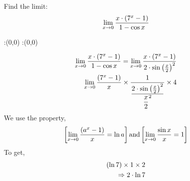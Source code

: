 


\newcommand{\ltzero}{\lim_{x \to 0}}
\newcommand{\q}{x \cdot \left( \vbone^{x} -1\right)}
\renewcommand{\l}{2\cdot {\sin \left( \frac{x}{2}\right)}^{2}}
\question Find the limit:  
\begin{align}
\ltzero \dfrac{\q}{{1-\cos x}} \notag
\end{align}


\watchout

\ifprintanswers
  \begin{marginfigure}
      :(0,0)
      :(0,0)
    \figdrawbegin{}
      \figdrawline [100,101]
    \figdrawend
    \figvisu{\figBoxA}{}{%
    }
    \centerline{\box\figBoxA}
  \end{marginfigure}
\fi 

\begin{solution}
\begin{align}
\ltzero \dfrac{\q}{{1-\cos x}} = \ltzero \dfrac{\q}{\l} \\
\ltzero \dfrac{(\vbone^{x} -1)}{x} \times \dfrac{1}{\dfrac{\l}{{\dfrac{x}{2}}^{2}}} \times 4  \\
\end{align}
We use the property,
\begin{align}
\left[ \ltzero \dfrac{(a^x - 1)}{x} = \ln a \right] \text{and} \left[ \ltzero \dfrac{\sin x}{x} = 1 \right] \notag
\end{align}
To get,
\begin{align}	
\left( \ln{7} \right) \times 1 \times 2 \\
\Rightarrow 2\cdot \ln{7}
\end{align}
\end{solution}


